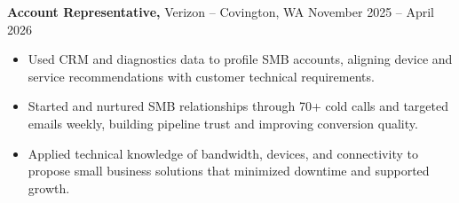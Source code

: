 \documentclass[11pt]{article}       %
\begin{document}
\textbf{Account Representative,} {Verizon} -- Covington, WA \hfill November 2025 -- April 2026 \\
\vspace{-9pt}
\begin{itemize}
  \item Used CRM and diagnostics data to profile SMB accounts, aligning device and service recommendations with customer technical requirements.
  \item Started and nurtured SMB relationships through 70+ cold calls and targeted emails weekly, building pipeline trust and improving conversion quality.
  \item Applied technical knowledge of bandwidth, devices, and connectivity to propose small business solutions that minimized downtime and supported growth.
\end{itemize}

\end{document}
